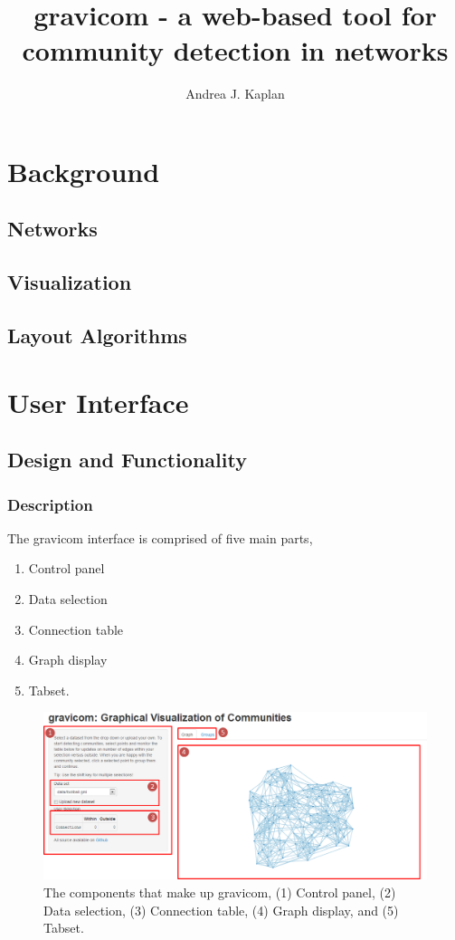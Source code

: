 \documentclass{article}\usepackage[]{graphicx}\usepackage[]{color}
\title{gravicom - a web-based tool for community detection in networks}
\author{Andrea J. Kaplan}
\begin{document}
\maketitle
\section{Background}
\subsection{Networks}
\subsection{Visualization}
\subsection{Layout Algorithms}

\section{User Interface}
\subsection{Design and Functionality}

\subsubsection{Description}

The gravicom interface is comprised of five main parts,
\begin{enumerate}
\item Control panel
\item Data selection
\item Connection table 
\item Graph display
\item Tabset.
\end{enumerate}

\begin{figure}[hbtp]
\centering
\includegraphics[width=\textwidth]{images/sitecomponents.png}
\caption{\label{fig:sitecomponents} The components that make up gravicom, (1) Control panel, (2) Data selection, (3) Connection table, (4) Graph display, and (5) Tabset.}
\end{figure}
\end{document}
